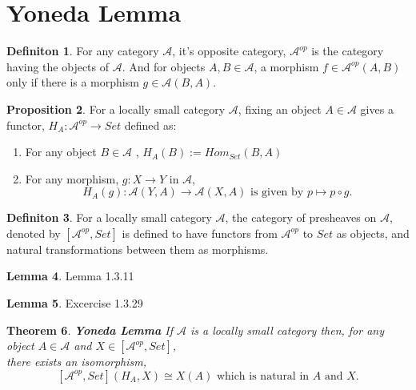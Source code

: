 \documentclass[18pt,a4paper]{article}
\newtheorem{theorem}{Theorem}[section]
\theoremstyle{definition}
\newtheorem{definition}[theorem]{Definiton}
\newtheorem{lemma}[theorem]{Lemma}
\newtheorem{proop}[theorem]{Proposition}
\begin{document}
\section{Yoneda Lemma} %
\begin{definition} %
For any category $\mathcal{A} $, it's opposite category, $\mathcal{A}^{op}$
is the category having the objects of $\mathcal{A}$.
And for objects $A,B \in \mathcal{A} $, a morphism $f \in \mathcal{A}^{op} (A,B)$
only if there is a morphism $g \in \mathcal{A}(B,A)$.
\end{definition}
\begin{proop} %
	For a locally small category $\mathcal{A}$, fixing an object $A \in \mathcal{A} $ gives
	a functor, $H_A: \mathcal{A} ^{op} \rightarrow Set$ defined as:
	\begin{enumerate}[label=(\roman*)]
		\item For any object $B \in \mathcal{A} $ , $H_A(B):=Hom_{Set}^{}(B,A)$
		\item For any morphism, $g : X \rightarrow Y $ in $\mathcal{A}$,
			\[H_A(g): \mathcal{A} (Y,A) \rightarrow \mathcal{A}(X,A)
				\text{ is given by } p \mapsto p \circ g.\]
	\end{enumerate}
\end{proop}
\begin{definition} %
	For a locally small category $\mathcal{A} $, the category of presheaves on $\mathcal{A} $, denoted by $[\mathcal{A} ^{op},Set]$
	is defined to have functors from $\mathcal{A} ^{op}$ to $Set$ as objects,
	and natural transformations between them as morphisms.
\end{definition}

\begin{lemma}
	Lemma 1.3.11
\end{lemma}
\begin{lemma}
	Excercise 1.3.29
\end{lemma}

\begin{theorem}{\textbf{Yoneda Lemma}} %
	If $\mathcal{A} $ is a locally small category then, for any object $A \in \mathcal{A} $
	and $X \in [ \mathcal{A}^{op},Set]$,\\ there exists an isomorphism,
	\[ [ \mathcal{A} ^{op},Set ](H_A,X)\cong X(A) \text{ which is natural in } A \text{ and } X.\]
\end{theorem}
\end{document}

